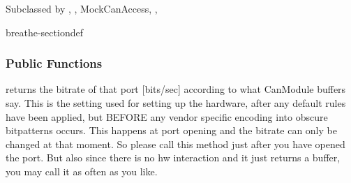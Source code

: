 \documentclass[a4paper,10pt,english]{sphinxmanual}
\begin{document}
\begin{fulllineitems}
\label{\detokenize{canports:_CPPv4N9CanModule10CCanAccessE}}%
\pysigstartmultiline
{}%
\pysigstopmultiline
\sphinxAtStartPar
Subclassed by {\hyperref[\detokenize{classesdetails:classAnaCanScan}]{}}, {\hyperref[\detokenize{vendors/systec:classCSockCanScan}]{}}, MockCanAccess, {\hyperref[\detokenize{vendors/peak:classPKCanScan}]{}}, {\hyperref[\detokenize{classesdetails:classSTCanScan}]{}}

\begin{sphinxuseclass}{breathe-sectiondef}\subsubsection*{Public Functions}

\begin{fulllineitems}
\label{\detokenize{canports:_CPPv4N9CanModule10CCanAccess14getPortBitrateEv}}%
\pysigstartmultiline
{}%
\pysigstopmultiline
\sphinxAtStartPar
returns the bitrate of that port {[}bits/sec{]} according to what CanModule buffers say. This is the setting used for setting up the hardware, after any default rules have been applied, but BEFORE any vendor specific encoding into obscure bitpatterns occurs. This happens at port opening and the bitrate can only be changed at that moment. So please call this method just after you have opened the port. But also since there is no hw interaction and it just returns a buffer, you may call it as often as you like. 

\end{fulllineitems}


\end{sphinxuseclass}
\end{fulllineitems}
\end{document}
